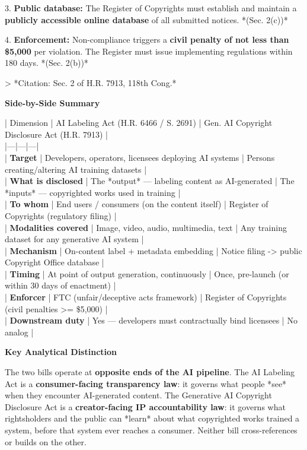 \documentclass[11pt]{article}
\begin{document}
3. \textbf{Public database:} The Register of Copyrights must establish and maintain a \textbf{publicly accessible online database} of all submitted notices. *(Sec. 2(c))*

4. \textbf{Enforcement:} Non-compliance triggers a \textbf{civil penalty of not less than \$5,000} per violation. The Register must issue implementing regulations within 180 days. *(Sec. 2(b))*

\textgreater{} *Citation: Sec. 2 of H.R. 7913, 118th Cong.*

\textbf{Side-by-Side Summary}

| Dimension | AI Labeling Act (H.R. 6466 / S. 2691) | Gen. AI Copyright Disclosure Act (H.R. 7913) | \\
|---|---|---| \\
| \textbf{Target} | Developers, operators, licensees deploying AI systems | Persons creating/altering AI training datasets | \\
| \textbf{What is disclosed} | The *output* --- labeling content as AI-generated | The *inputs* --- copyrighted works used in training | \\
| \textbf{To whom} | End users / consumers (on the content itself) | Register of Copyrights (regulatory filing) | \\
| \textbf{Modalities covered} | Image, video, audio, multimedia, text | Any training dataset for any generative AI system | \\
| \textbf{Mechanism} | On-content label + metadata embedding | Notice filing -\textgreater{} public Copyright Office database | \\
| \textbf{Timing} | At point of output generation, continuously | Once, pre-launch (or within 30 days of enactment) | \\
| \textbf{Enforcer} | FTC (unfair/deceptive acts framework) | Register of Copyrights (civil penalties \textgreater{}= \$5,000) | \\
| \textbf{Downstream duty} | Yes --- developers must contractually bind licensees | No analog |

\textbf{Key Analytical Distinction}

The two bills operate at \textbf{opposite ends of the AI pipeline}. The AI Labeling Act is a \textbf{consumer-facing transparency law}: it governs what people *see* when they encounter AI-generated content. The Generative AI Copyright Disclosure Act is a \textbf{creator-facing IP accountability law}: it governs what rightsholders and the public can *learn* about what copyrighted works trained a system, before that system ever reaches a consumer. Neither bill cross-references or builds on the other.
\end{document}
